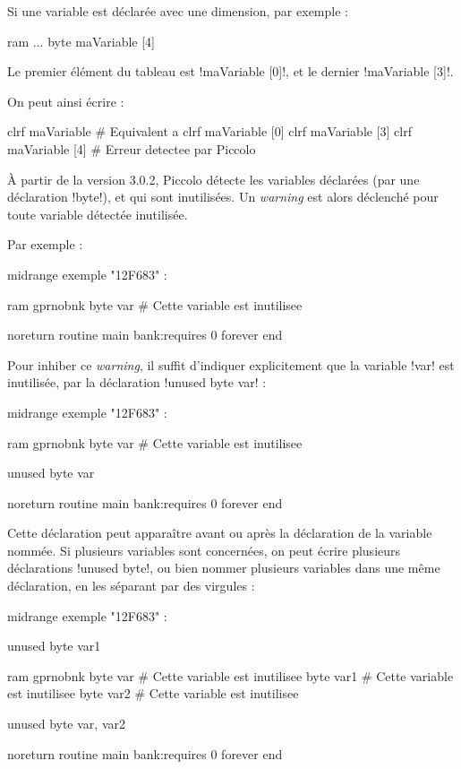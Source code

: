Si une variable est déclarée avec une dimension, par exemple :
\begin{piccolo}
ram ... { 
  byte maVariable [4]
}
\end{piccolo}

Le premier élément du tableau est \pic!maVariable [0]!, et le dernier  \pic!maVariable [3]!.

On peut ainsi écrire :
\begin{piccolo}
  clrf maVariable # Equivalent a clrf maVariable [0]
  clrf maVariable [3]
  clrf maVariable [4] # Erreur detectee par Piccolo
\end{piccolo}












À partir de la version 3.0.2, Piccolo détecte les variables déclarées (par une déclaration \pic!byte!), et qui sont inutilisées. Un \emph{warning} est alors déclenché pour toute variable détectée inutilisée.

Par exemple :

\begin{piccolo}
midrange exemple "12F683" :

ram gprnobnk {
  byte var # Cette variable est inutilisee
}

noreturn routine main bank:requires 0 {
  forever
  end
}
\end{piccolo}


Pour inhiber ce \emph{warning}, il suffit d'indiquer explicitement que la variable \pic!var! est inutilisée, par la déclaration \pic!unused byte var! :

\begin{piccolo}
midrange exemple "12F683" :

ram gprnobnk {
  byte var # Cette variable est inutilisee
}

unused byte var

noreturn routine main bank:requires 0 {
  forever
  end
}
\end{piccolo}

Cette déclaration peut apparaître avant ou après la déclaration de la variable nommée. Si plusieurs variables sont concernées, on peut écrire plusieurs déclarations \pic!unused byte!, ou bien nommer plusieurs variables dans une même déclaration, en les séparant par des virgules :

\begin{piccolo}
midrange exemple "12F683" :

unused byte var1

ram gprnobnk {
  byte var # Cette variable est inutilisee
  byte var1 # Cette variable est inutilisee
  byte var2 # Cette variable est inutilisee
}

unused byte var, var2

noreturn routine main bank:requires 0 {
  forever
  end
}
\end{piccolo}


